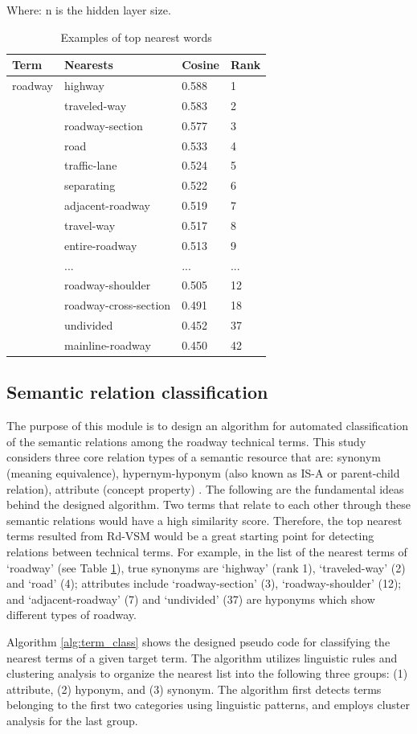 \documentclass[Journal, BackFigs,NoLists, DoubleSpace]{ascelike}%
\begin{document}
Where: n is the hidden layer size.
%
\begin{table} [t]
	\caption{Examples of top nearest words}
	\label{table:nearest_example}
	\centering
	\small
	\renewcommand{\arraystretch}{1.25}
	\begin{tabular}{l l l  l}
		\hline
		\textbf{Term} & \textbf{Nearests} & \textbf{Cosine} &\textbf{Rank}\\
		\hline
		roadway			& highway & 0.588 & 1\\
		& traveled-way & 0.583 & 2\\
		& roadway-section & 0.577 & 3\\
		& road & 0.533 & 4\\
		& traffic-lane & 0.524 &5\\
		& separating & 0.522 &6\\
		& adjacent-roadway & 0.519 & 7\\
		& travel-way & 0.517 & 8\\
		& entire-roadway & 0.513 & 9\\
		& ...&...& ...\\
		& roadway-shoulder & 0.505 & 12\\
		& roadway-cross-section & 0.491 & 18\\
		& undivided & 0.452 & 37\\
		& mainline-roadway & 0.450 & 42\\
		\hline
	\end{tabular}
	\normalsize
\end{table}

\subsection{Semantic relation classification}
The purpose of this module is to design an algorithm for automated classification of the semantic relations among the roadway technical terms. This study considers three core relation types of a semantic resource that are: synonym (meaning equivalence), hypernym-hyponym (also known as IS-A or parent-child relation), attribute (concept property) \cite{jiang1997semantic,lee13}. The following are the fundamental ideas behind the designed algorithm. Two terms that relate to each other through these semantic relations would have a high similarity score. Therefore, the top nearest terms resulted from Rd-VSM would be a great starting point for detecting relations between technical terms. For example, in the list of the nearest terms of `roadway' (see Table \ref{table:nearest_example}), true synonyms are `highway' (rank 1), `traveled-way' (2) and `road' (4); attributes include `roadway-section' (3), `roadway-shoulder' (12); and `adjacent-roadway' (7) and `undivided' (37) are hyponyms which show different types of roadway.
\par
Algorithm \ref{alg:term_class} shows the designed pseudo code for classifying the nearest terms of a given target term. The algorithm utilizes linguistic rules and clustering analysis to organize the nearest list into the following three groups: (1) attribute, (2) hyponym, and (3) synonym. The algorithm first detects terms belonging to the first two categories using linguistic patterns, and employs cluster analysis for the last group.
%
\end{document}
